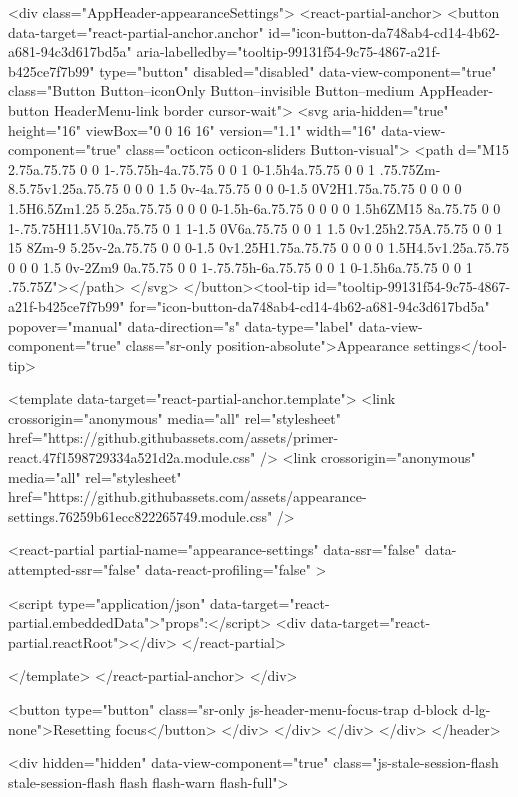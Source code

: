                 <div class="AppHeader-appearanceSettings">
    <react-partial-anchor>
      <button data-target="react-partial-anchor.anchor" id="icon-button-da748ab4-cd14-4b62-a681-94c3d617bd5a" aria-labelledby="tooltip-99131f54-9c75-4867-a21f-b425ce7f7b99" type="button" disabled="disabled" data-view-component="true" class="Button Button--iconOnly Button--invisible Button--medium AppHeader-button HeaderMenu-link border cursor-wait">  <svg aria-hidden="true" height="16" viewBox="0 0 16 16" version="1.1" width="16" data-view-component="true" class="octicon octicon-sliders Button-visual">
    <path d="M15 2.75a.75.75 0 0 1-.75.75h-4a.75.75 0 0 1 0-1.5h4a.75.75 0 0 1 .75.75Zm-8.5.75v1.25a.75.75 0 0 0 1.5 0v-4a.75.75 0 0 0-1.5 0V2H1.75a.75.75 0 0 0 0 1.5H6.5Zm1.25 5.25a.75.75 0 0 0 0-1.5h-6a.75.75 0 0 0 0 1.5h6ZM15 8a.75.75 0 0 1-.75.75H11.5V10a.75.75 0 1 1-1.5 0V6a.75.75 0 0 1 1.5 0v1.25h2.75A.75.75 0 0 1 15 8Zm-9 5.25v-2a.75.75 0 0 0-1.5 0v1.25H1.75a.75.75 0 0 0 0 1.5H4.5v1.25a.75.75 0 0 0 1.5 0v-2Zm9 0a.75.75 0 0 1-.75.75h-6a.75.75 0 0 1 0-1.5h6a.75.75 0 0 1 .75.75Z"></path>
</svg>
</button><tool-tip id="tooltip-99131f54-9c75-4867-a21f-b425ce7f7b99" for="icon-button-da748ab4-cd14-4b62-a681-94c3d617bd5a" popover="manual" data-direction="s" data-type="label" data-view-component="true" class="sr-only position-absolute">Appearance settings</tool-tip>

      <template data-target="react-partial-anchor.template">
        <link crossorigin="anonymous" media="all" rel="stylesheet" href="https://github.githubassets.com/assets/primer-react.47f1598729334a521d2a.module.css" />
<link crossorigin="anonymous" media="all" rel="stylesheet" href="https://github.githubassets.com/assets/appearance-settings.76259b61ecc822265749.module.css" />

<react-partial
  partial-name="appearance-settings"
  data-ssr="false"
  data-attempted-ssr="false"
  data-react-profiling="false"
>
  
  <script type="application/json" data-target="react-partial.embeddedData">{"props":{}}</script>
  <div data-target="react-partial.reactRoot"></div>
</react-partial>

      </template>
    </react-partial-anchor>
  </div>

          <button type="button" class="sr-only js-header-menu-focus-trap d-block d-lg-none">Resetting focus</button>
        </div>
      </div>
    </div>
  </div>
</header>

      <div hidden="hidden" data-view-component="true" class="js-stale-session-flash stale-session-flash flash flash-warn flash-full">
  
